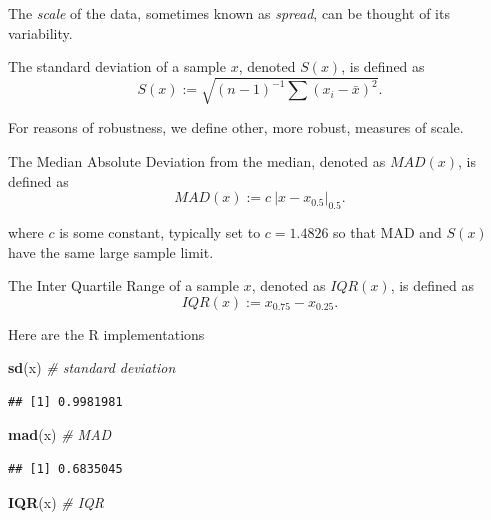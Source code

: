 \documentclass[]{book}
\newenvironment{Shaded}{\begin{snugshade}}{\end{snugshade}}
\newcommand{\KeywordTok}[1]{\textcolor[rgb]{0.13,0.29,0.53}{\textbf{#1}}}
\newcommand{\CommentTok}[1]{\textcolor[rgb]{0.56,0.35,0.01}{\textit{#1}}}
\newcommand{\NormalTok}[1]{#1}
\theoremstyle{definition}
\theoremstyle{definition}
\theoremstyle{definition}
\theoremstyle{remark}
\let\BeginKnitrBlock\begin \let\EndKnitrBlock\end
\begin{document}
The \emph{scale} of the data, sometimes known as \emph{spread}, can be
thought of its variability.

\BeginKnitrBlock{definition}[Standard Deviation]
\protect\hypertarget{def:unnamed-chunk-118}{}{\label{def:unnamed-chunk-118}
{} }The standard deviation of a sample
\(x\), denoted \(S(x)\), is defined as
\[ S(x):=\sqrt{(n-1)^{-1} \sum (x_i-\bar x)^2} . \]
\EndKnitrBlock{definition}

For reasons of robustness, we define other, more robust, measures of
scale.

\BeginKnitrBlock{definition}[MAD]
\protect\hypertarget{def:unnamed-chunk-119}{}{\label{def:unnamed-chunk-119}
{} }The Median Absolute Deviation from the median,
denoted as \(MAD(x)\), is defined as
\[MAD(x):= c \: |x-x_{0.5}|_{0.5} . \]
\EndKnitrBlock{definition}

where \(c\) is some constant, typically set to \(c=1.4826\) so that MAD
and \(S(x)\) have the same large sample limit.

\BeginKnitrBlock{definition}[IQR]
\protect\hypertarget{def:unnamed-chunk-120}{}{\label{def:unnamed-chunk-120}
{} }The Inter Quartile Range of a sample \(x\),
denoted as \(IQR(x)\), is defined as \[ IQR(x):= x_{0.75}-x_{0.25} .\]
\EndKnitrBlock{definition}

Here are the R implementations

\begin{Shaded}
\begin{Highlighting}[]
\KeywordTok{sd}\NormalTok{(x) }\CommentTok{# standard deviation}
\end{Highlighting}
\end{Shaded}

\begin{verbatim}
## [1] 0.9981981
\end{verbatim}

\begin{Shaded}
\begin{Highlighting}[]
\KeywordTok{mad}\NormalTok{(x) }\CommentTok{# MAD}
\end{Highlighting}
\end{Shaded}

\begin{verbatim}
## [1] 0.6835045
\end{verbatim}

\begin{Shaded}
\begin{Highlighting}[]
\KeywordTok{IQR}\NormalTok{(x) }\CommentTok{# IQR}
\end{Highlighting}
\end{Shaded}
\end{document}
